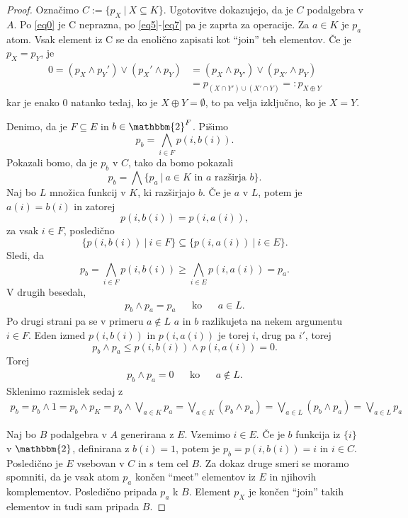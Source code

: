 \documentclass{amsart}
\begin{document}
\begin{proof}
    Označimo \(C := \{p_X ~|~ X \subseteq K\}\). Ugotovitve dokazujejo, da je $C$ podalgebra
    v $A$. Po \eqref{eq0} je C neprazna, po \eqref{eq5}-\eqref{eq7} pa je 
    zaprta za operacije. Za $a \in K$ je $p_a$ atom. Vsak element iz C se 
    da enolično zapisati kot ``join'' teh elementov. Če je $p_X = p_Y$, je
    \begin{align*}
        0 =(p_X \wedge p_Y') \vee (p_X' \wedge p_Y) &= (p_X \wedge p_{Y'}) 
        \vee (p_{X'} \wedge p_Y)
        \\&= p_{(X \cap Y') \cup (X' \cap Y)} =: p_{X \oplus Y}
    \end{align*}
    kar je enako $0$ natanko tedaj, ko je $X \oplus Y = \emptyset$, to pa velja izključno,
    ko je $X = Y$.

    Denimo, da je \(F \subseteq E\) in $b \in \mathbbm{2}^{F}$. Pišimo
    \[p_b = \bigwedge_{i\in F} p(i,b(i)).\]
    Pokazali bomo, da je $p_b$ v $C$, tako da bomo pokazali
    \[p_b = \bigwedge \{p_a~|~a\in K \text{ in } a \text{ razširja } b\}.\]
    Naj bo $L$ množica funkcij v $K$, ki razširjajo $b$. Če je $a$ v $L$, potem je 
    \(a(i) = b(i)\) in zatorej
    \[p(i,b(i)) = p(i,a(i)),\]
    za vsak $i \in F$, posledično
    \[\{p(i,b(i))~|~i\in F\} \subseteq \{p(i,a(i))~|~i\in E\}.\]
    Sledi, da 
    \[p_b = \bigwedge_{i\in F} p(i,b(i)) \geq \bigwedge_{i\in E} p(i,a(i)) = p_a.\]
    V drugih besedah,
    \begin{align*}
        p_b \wedge p_a = p_a && \text{ko} && a\in L. 
    \end{align*}
    Po drugi strani pa se v primeru $a \notin L$ $a$ in $b$ razlikujeta na nekem argumentu
    $i \in F$. Eden izmed $p(i,b(i))$ in $p(i,a(i))$ je torej $i$, drug pa $i'$, torej
    \[p_b \wedge p_a \leq p(i,b(i)) \wedge p(i,a(i)) = 0.\]
    Torej 
    \begin{align*}
        p_b \wedge p_a = 0 && \text{ko} && a\notin L. 
    \end{align*}
    Sklenimo razmislek sedaj z
    \begin{multline*}
        p_b = p_b \wedge 1 = p_b \wedge p_K = p_b \wedge \bigvee_{a \in K} p_a
        = \bigvee_{a \in K} (p_b \wedge p_a) = \bigvee_{a \in L} (p_b \wedge p_a)
        = \bigvee_{a \in L} p_a
    \end{multline*}

    Naj bo $B$ podalgebra v $A$ generirana z $E$. Vzemimo $i \in E$. Če je 
    $b$ funkcija iz $\{i\}$ v $\mathbbm{2}$, definirana z $b(i) = 1$, potem je
    $p_b = p(i, b(i)) = i$ in $i\in C$. Posledično je $E$ vsebovan v $C$ in s tem cel $B$.
    Za dokaz druge smeri se moramo spomniti, da je vsak atom $p_a$ končen ``meet''
    elementov iz $E$ in njihovih komplementov. Posledično pripada $p_a$ k $B$. Element
    \(p_X\) je končen ``join'' takih elementov in tudi sam pripada $B$.
\end{proof}
\end{document}
